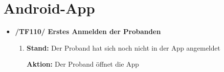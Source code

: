 \documentclass[a4paper]{scrreprt}
\begin{document}
	
	      \section{Android-App}
              \begin{itemize}
                  \item \textbf{/TF110/ Erstes Anmelden der Probanden}
                  \begin{enumerate}
                        \item \par \textbf{Stand: }Der Proband hat sich noch nicht in der App angemeldet
                        \par \textbf{Aktion: }Der Proband öffnet die App
                        \par {}


\end{enumerate}
\end{itemize}
\end{document}
